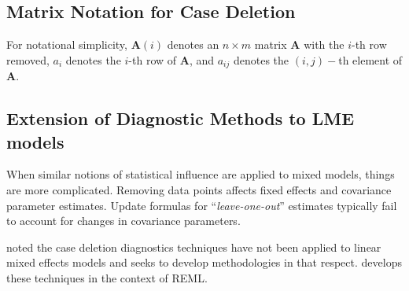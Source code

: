 \documentclass[12pt, a4paper]{report}
\theoremstyle{plain}
\theoremstyle{definition}
\theoremstyle{remark}
\begin{document}
\subsection{Matrix Notation for Case Deletion} %


For notational simplicity, $\boldsymbol{A}(i)$ denotes an $n \times m$ matrix $\boldsymbol{A}$ with the $i$-th row
removed, $a_i$ denotes the $i$-th row of $\boldsymbol{A}$, and $a_{ij}$ denotes the $(i, j)-$th element of $\boldsymbol{A}$.
%



\subsection{Extension of Diagnostic Methods to LME models}


When similar notions of statistical influence are applied to mixed models,
things are more complicated. Removing data points affects fixed effects and covariance parameter estimates.
Update formulas for “\textit{leave-one-out}” estimates typically fail to account for changes in covariance
parameters. 
%
%

\citet{Christiansen} noted the case deletion diagnostics techniques have not been applied to linear mixed effects models and seeks to develop methodologies in that respect. \citet{Christiansen} develops these techniques in the context of REML.
\end{document}
